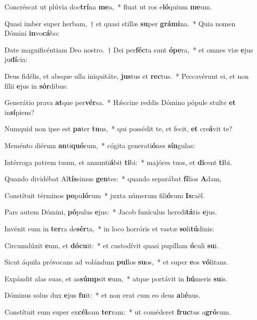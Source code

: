 \item Concréscat ut plúvia doc\textbf{trí}na \textbf{me}a,~* fluat ut ros e\textbf{ló}quium \textbf{me}um.
\item Quasi imber super herbam,~† et quasi stillæ \textbf{su}per \textbf{grá}\textbf{mi}na.~* Quia nomen Dómini \textbf{in}vo\textbf{cá}bo:
\item Date magnificéntiam Deo nostro.~† Dei per\textbf{féc}ta sunt \textbf{ó}\textbf{pe}ra,~* et omnes viæ \textbf{e}jus ju\textbf{dí}cia:
\item Deus fidélis, et absque ulla iniquitáte, \textbf{jus}tus et \textbf{rec}tus.~* Peccavérunt ei, et non fílii \textbf{e}jus in \textbf{sór}dibus:
\item Generátio prava \textbf{at}que per\textbf{vér}sa.~* Hǽccine reddis Dómino pópule stulte \textbf{et} in\textbf{sí}piens?
\item Numquid non ipse est \textbf{pa}ter \textbf{tu}us,~* qui possédit te, et fecit, \textbf{et} cre\textbf{á}vit te?
\item Meménto diérum \textbf{an}ti\textbf{quó}rum,~* cógita generati\textbf{ó}nes \textbf{sín}gulas:
\item Intérroga patrem tuum, et annunti\textbf{á}bit \textbf{ti}bi:~* majóres tuos, et \textbf{di}cent \textbf{ti}bi.
\item Quando dividébat Al\textbf{tís}simus \textbf{gen}tes:~* quando separábat \textbf{fí}lios \textbf{A}dam,
\item Constítuit términos \textbf{po}pu\textbf{ló}rum~* juxta númerum fili\textbf{ó}rum \textbf{Is}raël.
\item Pars autem Dómini, \textbf{pó}pulus \textbf{e}jus:~* Jacob funículus heredi\textbf{tá}tis \textbf{e}jus.
\item Invénit eum in \textbf{ter}ra de\textbf{sér}ta,~* in loco horróris et vastæ \textbf{so}li\textbf{tú}dinis:
\item Circumdúxit \textbf{e}um, et \textbf{dó}\textbf{cu}it:~* et custodívit quasi pupíllam \textbf{ó}culi \textbf{su}i.
\item Sicut áquila próvocans ad volándum \textbf{pul}los \textbf{su}os,~* et super \textbf{e}os \textbf{vó}litans.
\item Expándit alas suas, et as\textbf{súmp}sit \textbf{e}um,~* atque portávit in \textbf{hú}meris \textbf{su}is.
\item Dóminus solus dux \textbf{e}jus \textbf{fu}it:~* et non erat cum eo deus \textbf{a}li\textbf{é}nus.
\item Constítuit eum super ex\textbf{cél}sam \textbf{ter}ram:~* ut coméderet \textbf{fruc}tus a\textbf{gró}rum.
